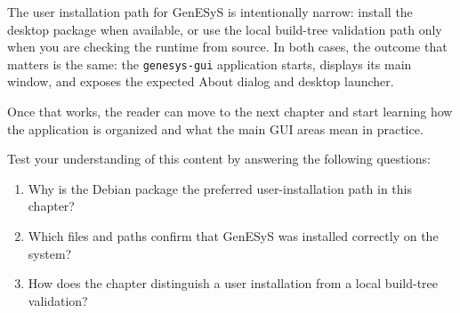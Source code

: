 The user installation path for GenESyS is intentionally narrow: install the
desktop package when available, or use the local build-tree validation path
only when you are checking the runtime from source. In both cases, the outcome
that matters is the same: the \texttt{genesys-gui} application starts, displays
its main window, and exposes the expected About dialog and desktop launcher.

Once that works, the reader can move to the next chapter and start learning how
the application is organized and what the main GUI areas mean in practice.

Test your understanding of this content by answering the following questions:

\begin{enumerate}
\item Why is the Debian package the preferred user-installation path in this chapter?
\item Which files and paths confirm that GenESyS was installed correctly on the system?
\item How does the chapter distinguish a user installation from a local build-tree validation?
\end{enumerate}
